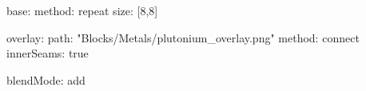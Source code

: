 base:
  method: repeat
  size: [8,8]
  
overlay:
  path: "Blocks/Metals/plutonium_overlay.png"
  method: connect
  innerSeams: true
  
blendMode: add